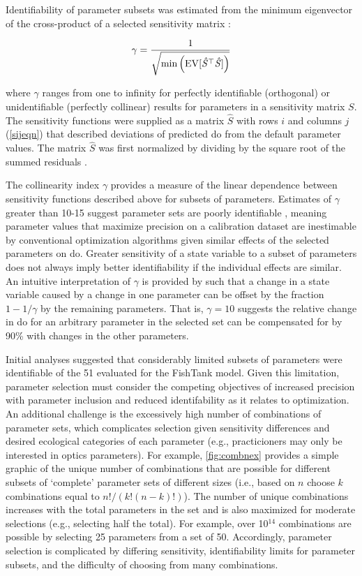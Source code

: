 \documentclass[letterpaper,12pt,oneside]{article}\usepackage[]{graphicx}\usepackage[]{color}
\begin{document}
Identifiability of parameter subsets was estimated from the minimum eigenvector of the cross-product of a selected sensitivity matrix \citep{Brun01,Omlin01}:

\begin{equation} \label{gameq}
\gamma = \frac{1} {\sqrt{ \min \left(\rm{EV}[\mathit{\hat{S}}^\top \mathit{\hat{S}}]\right)}}
\end{equation}

\noindent where $\gamma$ ranges from one to infinity for perfectly identifiable (orthogonal) or unidentifiable (perfectly collinear) results for parameters in a sensitivity matrix $S$.  The sensitivity functions were supplied as a matrix $\hat{S}$ with rows $i$ and columns $j$ (\cref{sijeqn}) that described deviations of predicted \ac{do} from the default parameter values.  The matrix $\hat{S}$ was first normalized by dividing by the square root of the summed residuals \citep{Omlin01,Soetaert10}. 

The collinearity index $\gamma$ provides a measure of the linear dependence between sensitivity functions described above for subsets of parameters. Estimates of $\gamma$ greater than 10-15 suggest parameter sets are poorly identifiable \citep{Brun01,Omlin01}, meaning parameter values that maximize precision on a calibration dataset are inestimable by conventional optimization algorithms given similar effects of the selected parameters on \ac{do}. Greater sensitivity of a state variable to a subset of parameters does not always imply better identifiability if the individual effects are similar.  An intuitive interpretation of $\gamma$ is provided by \citet{Brun01} such that a change in a state variable caused by a change in one parameter can be offset by the fraction $1 - 1/\gamma$ by the remaining parameters.  That is, $\gamma = 10$ suggests the relative change in \ac{do} for an arbitrary parameter in the selected set can be compensated for by 90\% with changes in the other parameters. 

Initial analyses suggested that considerably limited subsets of parameters were identifiable of the 51 evaluated for the FishTank model.  Given this limitation, parameter selection must consider the competing objectives of increased precision with parameter inclusion and reduced identifability as it relates to optimization.  An additional challenge is the excessively high number of combinations of parameter sets, which complicates selection given sensitivity differences and desired ecological categories of each parameter (e.g., practicioners may only be interested in optics parameters).  For example, \cref{fig:combnex} provides a simple graphic of the unique number of combinations that are possible for different subsets of `complete' parameter sets of different sizes (i.e., based on $n$ choose $k$ combinations equal to $n!/\left(k!\left(n-k\right)!\right)$).  The number of unique combinations increases with the total parameters in the set and is also maximized for moderate selections (e.g., selecting half the total).  For example, over 10$^{14}$ combinations are possible by selecting 25 parameters from a set of 50.  Accordingly, parameter selection is complicated by differing sensitivity, identifiability limits for parameter subsets, and the difficulty of choosing from many combinations.
\end{document}
